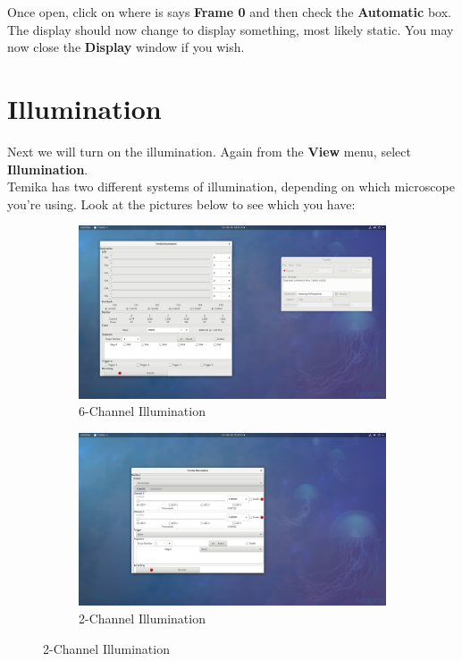 \documentclass{report}
\begin{document}
Once open, click on where is says \textbf{Frame 0} and then check the \textbf{Automatic} box. The display should now change to display something, most likely static. You may now close the \textbf{Display} window if you wish.





\newpage

\section{Illumination}

Next we will turn on the illumination. Again from the \textbf{View} menu, select \textbf{Illumination}.\\

Temika has two different systems of illumination, depending on which microscope you're using. Look at the pictures below to see which you have:

\begin{figure}[h]
	\begin{subfigure}[b]{0.5\textwidth}
		\includegraphics[width=\textwidth]{illumination}
		\caption{6-Channel Illumination}
	\end{subfigure}
	\begin{subfigure}[b]{0.5\textwidth}
		\includegraphics[width=\textwidth]{illumination_led}
		\caption{2-Channel Illumination}
	\end{subfigure}
\end{figure}
\end{document}

